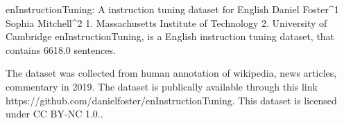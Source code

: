 
enInstructionTuning: A instruction tuning dataset for English
Daniel Foster^1 Sophia Mitchell^2
1. Massachusetts Institute of Technology 2. University of Cambridge
enInstructionTuning, is a English instruction tuning dataset, that contains 6618.0 sentences.

The dataset was collected from human annotation of wikipedia, news articles, commentary in 2019. 
The dataset is publically available through this link https://github.com/danielfoster/enInstructionTuning. This dataset is licensed under CC BY-NC 1.0..

